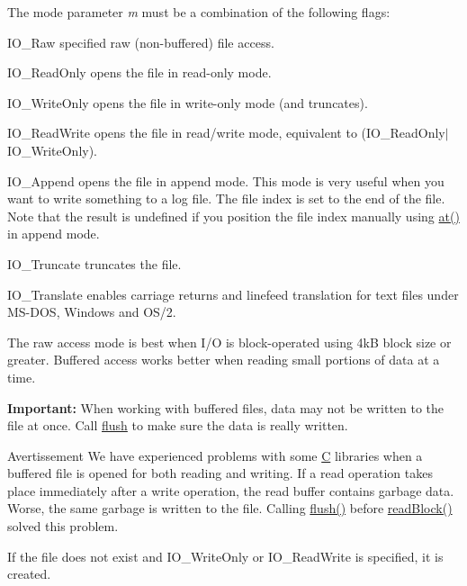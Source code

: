 The mode parameter {\itshape m} must be a combination of the following flags\+: 
\begin{DoxyItemize}
\item {\ttfamily I\+O\+\_\+\+Raw} specified raw (non-\/buffered) file access. 
\item {\ttfamily I\+O\+\_\+\+Read\+Only} opens the file in read-\/only mode. 
\item {\ttfamily I\+O\+\_\+\+Write\+Only} opens the file in write-\/only mode (and truncates). 
\item {\ttfamily I\+O\+\_\+\+Read\+Write} opens the file in read/write mode, equivalent to {\ttfamily }(I\+O\+\_\+\+Read\+Only$\vert$\+I\+O\+\_\+\+Write\+Only). 
\item {\ttfamily I\+O\+\_\+\+Append} opens the file in append mode. This mode is very useful when you want to write something to a log file. The file index is set to the end of the file. Note that the result is undefined if you position the file index manually using \hyperlink{class_q_file_a8cbf8e411026fa37903b1ab8e023c59c}{at()} in append mode. 
\item {\ttfamily I\+O\+\_\+\+Truncate} truncates the file. 
\item {\ttfamily I\+O\+\_\+\+Translate} enables carriage returns and linefeed translation for text files under M\+S-\/\+D\+O\+S, Windows and O\+S/2. 
\end{DoxyItemize}

The raw access mode is best when I/\+O is block-\/operated using 4k\+B block size or greater. Buffered access works better when reading small portions of data at a time.

{\bfseries Important\+:} When working with buffered files, data may not be written to the file at once. Call \hyperlink{class_q_file_a6d450a55bc3a8145fd33a7ee08051830}{flush} to make sure the data is really written.

\begin{DoxyWarning}{Avertissement}
We have experienced problems with some \hyperlink{class_c}{C} libraries when a buffered file is opened for both reading and writing. If a read operation takes place immediately after a write operation, the read buffer contains garbage data. Worse, the same garbage is written to the file. Calling \hyperlink{class_q_file_a6d450a55bc3a8145fd33a7ee08051830}{flush()} before \hyperlink{class_q_file_ab9a42e65a2fcd51bae5f2a186ff5bee5}{read\+Block()} solved this problem.
\end{DoxyWarning}
If the file does not exist and {\ttfamily I\+O\+\_\+\+Write\+Only} or {\ttfamily I\+O\+\_\+\+Read\+Write} is specified, it is created.


